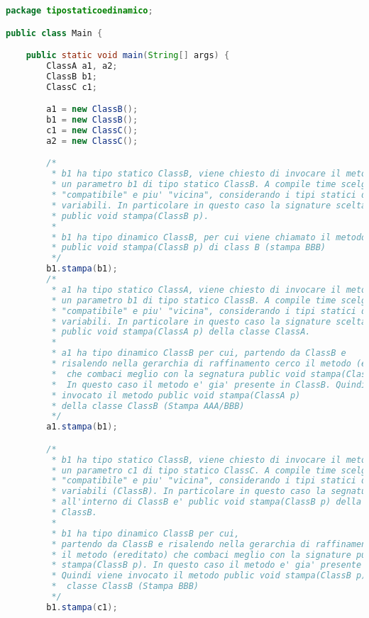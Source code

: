 \documentclass{article}
\begin{document}
\begin{lstlisting}[language=Java,escapechar=|]
package tipostaticoedinamico;

public class Main {

	public static void main(String[] args) {
		ClassA a1, a2;
		ClassB b1;
		ClassC c1;

		a1 = new ClassB();
		b1 = new ClassB();
		c1 = new ClassC();
		a2 = new ClassC();

		/*
		 * b1 ha tipo statico ClassB, viene chiesto di invocare il metodo stampa su
		 * un parametro b1 di tipo statico ClassB. A compile time scelgo la segnatura
		 * "compatibile" e piu' "vicina", considerando i tipi statici delle
		 * variabili. In particolare in questo caso la signature scelta e'
		 * public void stampa(ClassB p).
		 * 
		 * b1 ha tipo dinamico ClassB, per cui viene chiamato il metodo
		 * public void stampa(ClassB p) di class B (stampa BBB)
		 */
		b1.stampa(b1);
		/*
		 * a1 ha tipo statico ClassA, viene chiesto di invocare il metodo stampa su
		 * un parametro b1 di tipo statico ClassB. A compile time scelgo la segnatura
		 * "compatibile" e piu' "vicina", considerando i tipi statici delle
		 * variabili. In particolare in questo caso la signature scelta e'
		 * public void stampa(ClassA p) della classe ClassA.
		 * 
		 * a1 ha tipo dinamico ClassB per cui, partendo da ClassB e
		 * risalendo nella gerarchia di raffinamento cerco il metodo (ereditato)
		 *  che combaci meglio con la segnatura public void stampa(ClassA p).
		 *  In questo caso il metodo e' gia' presente in ClassB. Quindi viene 
		 * invocato il metodo public void stampa(ClassA p) 
		 * della classe ClassB (Stampa AAA/BBB)
		 */
		a1.stampa(b1);

		/*
		 * b1 ha tipo statico ClassB, viene chiesto di invocare il metodo stampa su
		 * un parametro c1 di tipo statico ClassC. A compile time scelgo la segnatura
		 * "compatibile" e piu' "vicina", considerando i tipi statici delle
		 * variabili (ClassB). In particolare in questo caso la segnatura scelta
		 * all'interno di ClassB e' public void stampa(ClassB p) della classe
		 * ClassB.
		 * 
		 * b1 ha tipo dinamico ClassB per cui,
		 * partendo da ClassB e risalendo nella gerarchia di raffinamento, cerco
		 * il metodo (ereditato) che combaci meglio con la signature public void 
		 * stampa(ClassB p). In questo caso il metodo e' gia' presente in ClassB.
		 * Quindi viene invocato il metodo public void stampa(ClassB p) della
		 *  classe ClassB (Stampa BBB)
		 */
		b1.stampa(c1);


\end{lstlisting}
\end{document}
